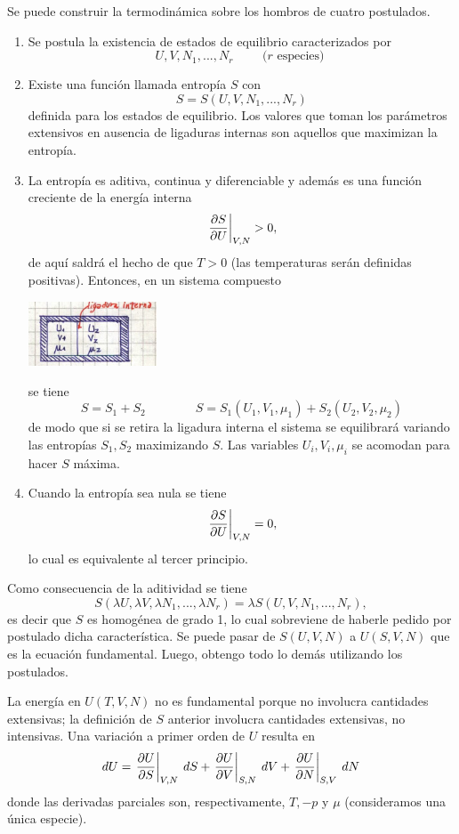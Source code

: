 \documentclass[10pt,oneside]{CBFT_book}
\begin{document}
Se puede construir la termodinámica sobre los hombros de cuatro postulados.
\begin{enumerate}
 \item Se postula la existencia de estados de equilibrio caracterizados por 
 \[
	U, V, N_1, ..., N_r \qquad \text{ ($r$ especies) }
 \]
 \item Existe una función llamada entropía $S$ con
 \[
	S = S(U, V, N_1, ..., N_r)
 \]
 definida para los estados de equilibrio. Los valores que toman los parámetros extensivos en
 ausencia de ligaduras internas son aquellos que maximizan la entropía.
 \item La entropía es aditiva, continua y diferenciable y además es una función creciente de la
 energía interna
 \[
	\left.\frac{\partial^{\hspace{-0.05em}} {S}}{\partial {U}^{\hspace{-0.05em}}}\right|_{V,N} > 0,
 \]
 de aquí saldrá el hecho de que $T > 0$ (las temperaturas serán definidas positivas).
 Entonces, en un sistema compuesto
 
\includegraphics[width=0.30\textwidth]{images/1606329014.jpg}
 
 se tiene 
 \[
	S = S_1 + S_2 \qquad \qquad S = S_1(U_1,V_1,\mu_1) + S_2(U_2,V_2,\mu_2)
 \]
 de modo que si se retira la ligadura interna el sistema se equilibrará variando las entropías $S_1,S_2$
 maximizando $S$. Las variables $U_i,V_i,\mu_i$ se acomodan para hacer $S$ máxima.
 \item Cuando la entropía sea nula se tiene
 \[
	\left.\frac{\partial^{\hspace{-0.05em}} {S}}{\partial {U}^{\hspace{-0.05em}}}\right|_{V,N} = 0,
 \]
 lo cual es equivalente al tercer principio.
\end{enumerate}

Como consecuencia de la aditividad se tiene
\[
	S(\lambda U, \lambda V, \lambda N_1, ..., \lambda N_r ) =
	\lambda S(U,V,N_1,...,N_r),
\]
es decir que $S$ es homogénea de grado 1, lo cual sobreviene de haberle pedido por postulado dicha
característica. Se puede pasar de $S(U,V,N)$ a $U(S,V,N)$ que es la ecuación fundamental.
Luego, obtengo todo lo demás utilizando los postulados.

La energía en $U(T,V,N)$ no es fundamental porque no involucra cantidades extensivas; la definición
de $S$ anterior involucra cantidades extensivas, no intensivas.
Una variación a primer orden de $U$ resulta en
\[
	dU = \left.\frac{\partial^{\hspace{-0.05em}} {U}}{\partial {S}^{\hspace{-0.05em}}}\right|_{V,N} \: dS + \left.\frac{\partial^{\hspace{-0.05em}} {U}}{\partial {V}^{\hspace{-0.05em}}}\right|_{S,N} \: dV + \left.\frac{\partial^{\hspace{-0.05em}} {U}}{\partial {N}^{\hspace{-0.05em}}}\right|_{S,V} \: dN
\]
donde las derivadas parciales son, respectivamente, $T,-p$ y $\mu$ (consideramos una única especie).
\end{document}
